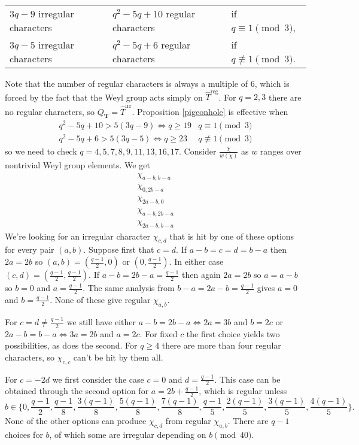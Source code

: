\documentclass[11pt]{amsart}
\theoremstyle{plain}
\theoremstyle{definition}
\newcommand{\T}{\mathbf{T}}
\newcommand{\hatT}{\hat{T}}
\newcommand{\Threg}{\hatT^{\operatorname{reg}}}
\newcommand{\Thirr}{\hatT^{\operatorname{irr}}}
\begin{document}
\vspace{0.2in}

\begin{tabular}{lll}
$3q-9$ irregular characters & $q^2-5q+10$ regular characters & if $q \equiv 1 \pmod{3}$, \\
$3q-5$ irregular characters & $q^2-5q+6$ regular characters & if $q \not\equiv 1 \pmod{3}$.
\end{tabular}

\vspace{0.2in}

Note that the number of regular characters is always a multiple of $6$, which is forced by the fact that the Weyl group acts simply on $\Threg$.  For $q = 2, 3$ there are no regular characters, so $Q_{\T} = \Thirr$.  Proposition \ref{pigeonhole} is effective when
\begin{align*}
q^2 - 5q + 10 > 5(3q - 9) \Leftrightarrow q \ge 19 & q \equiv 1 \pmod{3} \\
q^2 - 5q + 6 > 5(3q-5) \Leftrightarrow q \ge 23 & q \not\equiv 1\pmod{3}
\end{align*}
so we need to check $q=4,5,7,8,9,11,13,16,17$.  Consider $\frac{\chi}{w(\chi)}$ as $w$ ranges over nontrivial Weyl group elements.  We get
\begin{align*}
\chi_{a-b,b-a} \\
\chi_{0,2b-a} \\
\chi_{2a-b,0} \\
\chi_{a-b,2b-a} \\
\chi_{2a-b,b-a}
\end{align*}
We're looking for an irregular character $\chi_{c,d}$ that is hit by one of these options for every pair $(a,b)$.  Suppose first that $c=d$.  If $a-b = c = d = b-a$ then $2a = 2b$ so $(a,b) = (\frac{q-1}{2}, 0)$ or $(0,\frac{q-1}{2})$.  In either case $(c, d) = (\frac{q-1}{2}, \frac{q-1}{2})$.  If $a - b = 2b - a = \frac{q-1}{2}$ then again $2a = 2b$ so $a = a - b$ so $b = 0$ and $a = \frac{q-1}{2}$.  The same analysis from $b - a = 2a - b = \frac{q-1}{2}$ gives $a = 0$ and $b = \frac{q-1}{2}$.  None of these give regular $\chi_{a,b}$.

For $c = d \ne \frac{q-1}{2}$ we still have either $a - b = 2b - a \Leftrightarrow 2a = 3b$ and $b = 2c$ or $2a-b = b-a \Leftrightarrow 3a = 2b$ and $a = 2c$.  For fixed $c$ the first choice yields two possibilities, as does the second.  For $q \ge 4$ there are more than four regular characters, so $\chi_{c,c}$ can't be hit by them all.

For $c = -2d$ we first consider the case $c = 0$ and $d = \frac{q-1}{2}$.  This case can be obtained through the second option for $a = 2b + \frac{q-1}{2}$, which is regular unless
$$b \in \{0, \frac{q-1}{2}, \frac{q-1}{8}, \frac{3(q-1)}{8}, \frac{5(q-1)}{8}, \frac{7(q-1)}{8}, \frac{q-1}{5}, \frac{2(q-1)}{5}, \frac{3(q-1)}{5}, \frac{4(q-1)}{5}\}.$$
None of the other options can produce $\chi_{c,d}$ from regular $\chi_{a,b}$.  There are $q-1$ choices for $b$, of which some are irregular depending on $b \pmod{40}$.
\end{document}
